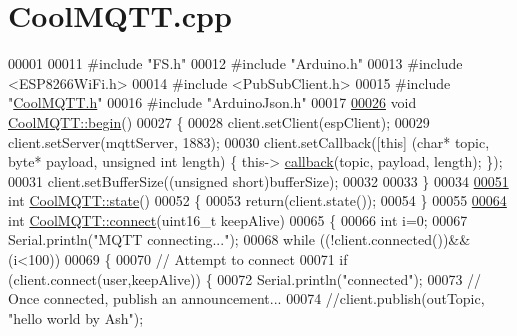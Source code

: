 \hypertarget{_cool_m_q_t_t_8cpp_source}{}\section{Cool\+M\+Q\+T\+T.\+cpp}

\begin{DoxyCode}
00001 
00011 \textcolor{preprocessor}{#include "FS.h"}
00012 \textcolor{preprocessor}{#include "Arduino.h"}  
00013 \textcolor{preprocessor}{#include <ESP8266WiFi.h>}
00014 \textcolor{preprocessor}{#include <PubSubClient.h>}                             
00015 \textcolor{preprocessor}{#include "\hyperlink{_cool_m_q_t_t_8h}{CoolMQTT.h}"}
00016 \textcolor{preprocessor}{#include "ArduinoJson.h"}
00017 
\hyperlink{class_cool_m_q_t_t_ac9248808641ebf3054ed0620ea9d0100}{00026} \textcolor{keywordtype}{void} \hyperlink{class_cool_m_q_t_t_ac9248808641ebf3054ed0620ea9d0100}{CoolMQTT::begin}()
00027 \{ 
00028     client.setClient(espClient);
00029     client.setServer(mqttServer, 1883); 
00030     client.setCallback([\textcolor{keyword}{this}] (\textcolor{keywordtype}{char}* topic, byte* payload, \textcolor{keywordtype}{unsigned} \textcolor{keywordtype}{int} length) \{ this->
      \hyperlink{class_cool_m_q_t_t_a30d82ad665bfb603f46ecdbc290775df}{callback}(topic, payload, length); \});
00031     client.setBufferSize((\textcolor{keywordtype}{unsigned} \textcolor{keywordtype}{short})bufferSize);
00032 
00033 \}
00034 
\hyperlink{class_cool_m_q_t_t_a5d003307eff78efbd585e42b43b72b6d}{00051} \textcolor{keywordtype}{int} \hyperlink{class_cool_m_q_t_t_a5d003307eff78efbd585e42b43b72b6d}{CoolMQTT::state}()
00052 \{
00053     \textcolor{keywordflow}{return}(client.state());
00054 \}
00055 
\hyperlink{class_cool_m_q_t_t_a58b0b1f64b269c2681685208262fba1d}{00064} \textcolor{keywordtype}{int} \hyperlink{class_cool_m_q_t_t_a58b0b1f64b269c2681685208262fba1d}{CoolMQTT::connect}(uint16\_t keepAlive)
00065 \{       
00066     \textcolor{keywordtype}{int} i=0;
00067     Serial.println(\textcolor{stringliteral}{"MQTT connecting..."});
00068     \textcolor{keywordflow}{while} ((!client.connected())&&(i<100)) 
00069     \{
00070         \textcolor{comment}{// Attempt to connect}
00071         \textcolor{keywordflow}{if} (client.connect(user,keepAlive)) \{
00072             Serial.println(\textcolor{stringliteral}{"connected"});
00073             \textcolor{comment}{// Once connected, publish an announcement...}
00074             \textcolor{comment}{//client.publish(outTopic, "hello world by Ash");}

\end{DoxyCode}
